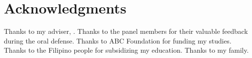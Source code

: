 \chapter{Acknowledgments}

Thanks to my adviser, \adviser. Thanks to the panel members for their valuable feedback during the oral defense. Thanks to ABC Foundation for funding my studies. Thanks to the Filipino people for subsidizing my education. Thanks to my family.
